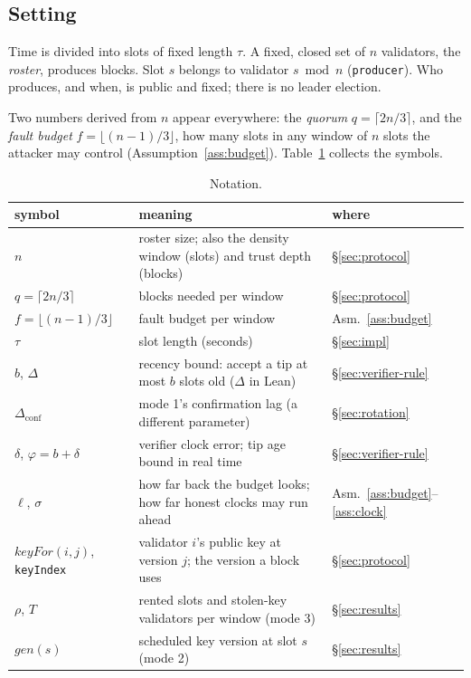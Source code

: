 \documentclass[10pt]{article}
\DeclareRobustCommand{\code}[1]{{\renewcommand{\_}{\textunderscore\allowbreak}\texttt{#1}}}
\newcommand{\quorum}{\ensuremath{q}}
\newcommand{\fmax}{\ensuremath{f}}
\begin{document}
\subsection{Setting}

Time is divided into slots of fixed length $\tau$. A fixed, closed set of
$n$ validators, the \emph{roster}, produces blocks. Slot $s$ belongs to
validator $s \bmod n$ (\code{producer}). Who produces, and when, is
public and fixed; there is no leader election.

Two numbers derived from $n$ appear everywhere: the \emph{quorum}
$\quorum = \lceil 2n/3 \rceil$, and the \emph{fault budget}
$\fmax = \lfloor (n-1)/3 \rfloor$, how many slots in any window of $n$
slots the attacker may control (Assumption~\ref{ass:budget}).
Table~\ref{tab:notation} collects the symbols.

\begin{table}[t]
\centering
\small
\begin{tabular}{@{}p{3.4cm}p{9.6cm}l@{}}
\toprule
symbol & meaning & where \\
\midrule
$n$ & roster size; also the density window (slots) and trust depth
  (blocks) & \S\ref{sec:protocol} \\
$\quorum = \lceil 2n/3 \rceil$ & blocks needed per window & \S\ref{sec:protocol} \\
$\fmax = \lfloor (n{-}1)/3 \rfloor$ & fault budget per window & Asm.~\ref{ass:budget} \\
$\tau$ & slot length (seconds) & \S\ref{sec:impl} \\
$b$, $\Delta$ & recency bound: accept a tip at most $b$ slots old ($\Delta$ in Lean) & \S\ref{sec:verifier-rule} \\
$\Delta_{\mathrm{conf}}$ & mode 1's confirmation lag (a different parameter) & \S\ref{sec:rotation} \\
$\delta$, $\varphi = b + \delta$ & verifier clock error; tip age bound in real time & \S\ref{sec:verifier-rule} \\
$\ell$, $\sigma$ & how far back the budget looks; how far honest clocks may run ahead & Asm.~\ref{ass:budget}--\ref{ass:clock} \\
$\mathit{keyFor}(i,j)$, \code{keyIndex} & validator $i$'s public key at
  version $j$; the version a block uses & \S\ref{sec:protocol} \\
$\rho$, $T$ & rented slots and stolen-key validators per window
  (mode 3) & \S\ref{sec:results} \\
$\mathit{gen}(s)$ & scheduled key version at slot $s$ (mode 2) & \S\ref{sec:results} \\
\bottomrule
\end{tabular}
\caption{Notation.}
\label{tab:notation}
\end{table}
\end{document}
